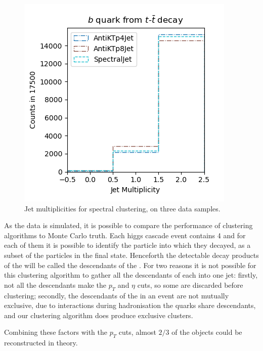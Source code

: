 \begin{figure}[htp]
    \begin{minipage}[c]{0.29\textwidth}
        \includegraphics[width=\textwidth]{graphics/multiplicity/tt_bar.png}
    \end{minipage}\hfill
    \caption{Jet multiplicities for spectral clustering, on three data samples.
    }\label{fig:multiplicity}
\end{figure}    



As the data is simulated, it is possible to compare the performance of clustering algorithms to Monte Carlo truth.
Each higgs cascade event contains 4  and for each of them it is possible to identify the particle into which they decayed, as a subset of the particles in the final state.
Henceforth the detectable decay products of the  will be called the descendants of the .
For two reasons it is not possible for this clustering algorithm to gather all the descendants
of each  into one jet:
firstly, not all the descendants make the \(p_T\) and \(\eta\) cuts, so some are discarded before clustering;
secondly, the descendants of the  in an event are not mutually exclusive, due to interactions during hadronisation the quarks share descendants, and our clustering algorithm does produce exclusive clusters.

Combining these factors with the \(p_T\) cuts, almost \(2/3\) of the objects could be reconstructed in theory.

